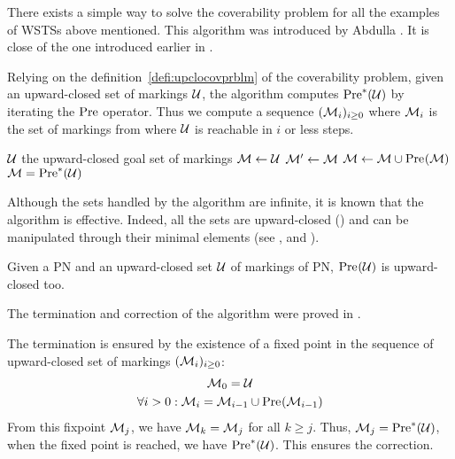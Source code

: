 There exists a simple way to solve the coverability problem for all the examples of \acp{WSTS} above mentioned.
This algorithm was introduced by Abdulla  \citep{Abdulla96}.
It is close of the one introduced earlier in \cite{Finkel90}.

Relying on the definition~\ref{defi:upclocovprblm} of the coverability problem, given an upward-closed set of markings $\mathcal{U}$, the algorithm computes $\operatorname{Pre}^*_{}(\mathcal{U})$ by iterating the $\operatorname{Pre}$ operator.
Thus we compute a sequence $(\mathcal{M}_i)_{i \geq 0}$ where $\mathcal{M}_i$ is the set of markings from where $\mathcal{U}$ is reachable in $i$ or less steps.


\begin{algorithm}
  \caption{$\back$}
  \label{algo:back}

  \begin{algorithmic}
    \Require $\mathcal{U}$ the upward-closed goal set of markings
    \State $\mathcal{M} \gets \mathcal{U}$
    \Repeat
      \State $\mathcal{M}'\gets \mathcal{M}$
      \State $\mathcal{M} \gets \mathcal{M} \cup \operatorname{Pre}_{}(\mathcal{M})$
    \Ensure $\mathcal{M} = \operatorname{Pre}^*_{}(\mathcal{U})$
  \end{algorithmic}
\end{algorithm}


Although the sets handled by the algorithm are infinite, it is known that the algorithm is effective.
Indeed, all the sets are upward-closed () and can be manipulated through their minimal elements (see , and \cite{Ganty09, valk1985residue}).

\begin{lemm}
  \label{theo:pre-upc}
  Given a \ac{PN} and an upward-closed set $\mathcal{U}$ of markings of \ac{PN}, $\operatorname{Pre}_{}(\mathcal{U})$ is upward-closed too.
\end{lemm}

The termination and correction of the algorithm were proved in \cite{Abdulla96}.%


The termination is ensured by the existence of a fixed point in the sequence of upward-closed set of markings $(\mathcal{M}_i)_{i \geq 0}$:
\begin{gather*}
  \mathcal{M}_0 = \mathcal{U} \\
  \forall i > 0 : \mathcal{M}_i = \mathcal{M}_{i-1} \cup \operatorname{Pre}_{}(\mathcal{M}_{i-1})
\end{gather*}
From this fixpoint $\mathcal{M}_j$, we have $\mathcal{M}_k = \mathcal{M}_j$ for all $k \geq j$.
Thus, $\mathcal{M}_j = \operatorname{Pre}^*_{}(\mathcal{U})$,  when the fixed point is reached, we have $\operatorname{Pre}^*_{}(\mathcal{U})$.
This ensures the correction.

